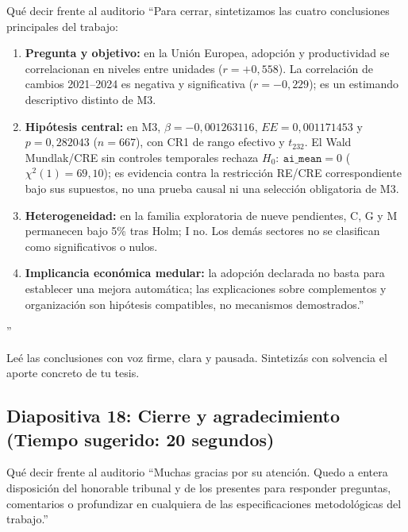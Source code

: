 \documentclass[11pt,a4paper]{article}
\begin{document}
\begin{speechbox}{Qué decir frente al auditorio}
``Para cerrar, sintetizamos las cuatro conclusiones principales del trabajo:
\begin{enumerate}[itemsep=0.2em]
  \item \textbf{Pregunta y objetivo:} en la Unión Europea, adopción y productividad se correlacionan en niveles entre unidades ($r=+0{,}558$). La correlación de cambios 2021--2024 es negativa y significativa ($r=-0{,}229$); es un estimando descriptivo distinto de M3.
  \item \textbf{Hipótesis central:} en M3, $\beta=-0{,}001263116$, $EE=0{,}001171453$ y $p=0{,}282043$ ($n=667$), con CR1 de rango efectivo y $t_{232}$. El Wald Mundlak/CRE sin controles temporales rechaza $H_0:\ \texttt{ai\_mean}=0$ ($\chi^2(1)=69{,}10$); es evidencia contra la restricción RE/CRE correspondiente bajo sus supuestos, no una prueba causal ni una selección obligatoria de M3.
  \item \textbf{Heterogeneidad:} en la familia exploratoria de nueve pendientes, C, G y M permanecen bajo 5\% tras Holm; I no. Los demás sectores no se clasifican como significativos o nulos.
  \item \textbf{Implicancia económica medular:} la adopción declarada no basta para establecer una mejora automática; las explicaciones sobre complementos y organización son hipótesis compatibles, no mecanismos demostrados.''
\end{enumerate}''
\end{speechbox}

\begin{tipbox}
Leé las conclusiones con voz firme, clara y pausada. Sintetizás con solvencia el aporte concreto de tu tesis.
\end{tipbox}

\subsection*{Diapositiva 18: Cierre y agradecimiento (Tiempo sugerido: 20 segundos)}

\begin{speechbox}{Qué decir frente al auditorio}
``Muchas gracias por su atención. Quedo a entera disposición del honorable tribunal y de los presentes para responder preguntas, comentarios o profundizar en cualquiera de las especificaciones metodológicas del trabajo.''
\end{speechbox}
\end{document}
